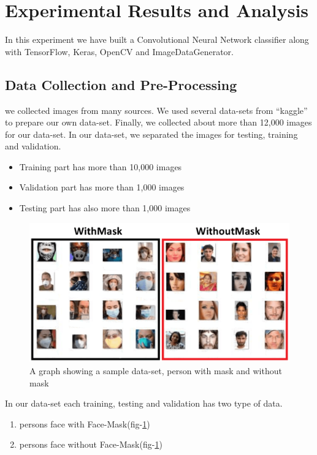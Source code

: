 \documentclass[conference]{IEEEtran}
\begin{document}
\section{Experimental Results and Analysis }
In this experiment we have built a Convolutional Neural Network classifier along with TensorFlow, Keras, OpenCV and ImageDataGenerator.

\subsection{Data Collection and Pre-Processing}
we collected images from many sources. We used several data-sets from “kaggle” to prepare our own data-set. Finally, we collected about more than 12,000 images for our data-set. In our data-set, we separated the images for testing, training and validation.
\begin{itemize}
  \item Training part has more than 10,000 images 
  \item Validation part has more than 1,000 images 
  \item Testing part has also more than 1,000 images 
\end{itemize}

\begin{center}
\begin{figure}[htbp]
  \includegraphics[width=1.0\linewidth]{188500388_1165620213940458_5711695426970840234_n.png}
  \caption{A graph showing a sample data-set, person with mask and without mask}
  \label{fig:fig 9}
\end{figure}
\end{center}

In our data-set each training, testing and validation has two type of data.
\begin{enumerate}
  \item persons face with Face-Mask(fig-\ref{fig:fig 9})
  \item persons face without Face-Mask(fig-\ref{fig:fig 9})
\end{enumerate}
\end{document}
